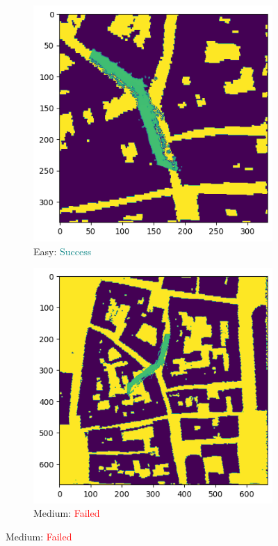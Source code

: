 \documentclass[11pt]{article}
\begin{document}
    \newpage
    \begin{figure}[p]
        \centering
        \begin{subfigure}{0.45\textwidth}
            \centering
            \includegraphics[width=\linewidth]{images/full/easy/5_6_1_easy}
            \caption{Easy: \textcolor{teal}{Success}}
            \label{fig:5_6_1_easy}
        \end{subfigure}
        \hfill
        \begin{subfigure}{0.45\textwidth}
            \centering
            \includegraphics[width=\linewidth]{images/full/medium/5_6_1_medium}
            \caption{Medium: \textcolor{red}{Failed}}
            \label{fig:5_6_1_medium}
        \end{subfigure}


\end{figure}
\end{document}
